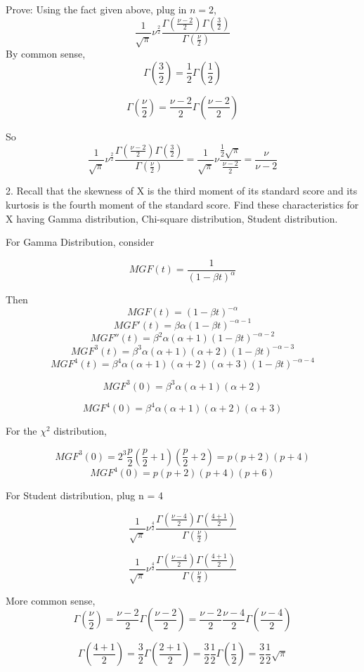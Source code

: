 \documentclass{article}
\begin{document}
Prove:
Using the fact given above, plug in $n = 2$, 
$$  \frac{1}{\sqrt{ \pi}} \nu^{\frac{2}{2}} \frac{\Gamma(\frac{\nu-2}{2})\Gamma(\frac{3}{2})}{\Gamma(\frac{\nu}{2})}$$
By common sense, 
$$\Gamma(\frac{3}{2}) = \frac{1}{2} \Gamma(\frac{1}{2})$$

$$\Gamma(\frac{\nu}{2}) = \frac{\nu-2}{2} \Gamma(\frac{\nu-2}{2})$$

So $$  \frac{1}{\sqrt{ \pi}} \nu^{\frac{2}{2}} \frac{\Gamma(\frac{\nu-2}{2})\Gamma(\frac{3}{2})}{\Gamma(\frac{\nu}{2})} = \frac{1}{\sqrt{ \pi}} \nu\frac{\frac{1}{2}\sqrt{\pi}}{\frac{\nu-2}{2}} =\frac\nu{\nu-2}  $$

2. Recall that the skewness of X is the third moment of its standard score and its kurtosis is the fourth moment of the standard score. Find these characteristics for X having Gamma distribution, Chi-square distribution, Student distribution.

For Gamma Distribution, consider 

$$MGF(t) = \frac{1}{(1-\beta t) ^ \alpha }$$

Then 
$$MGF(t) = {(1-\beta t) ^ {-\alpha} }$$
$$MGF'(t) = \beta \alpha {(1-\beta t) ^ {-\alpha-1} }$$
$$MGF''(t) = \beta^2 \alpha ({\alpha+1}){(1-\beta t) ^ {-\alpha-2} }$$
$$MGF^{3}(t) = \beta^3 \alpha ({\alpha+1})({\alpha+2}){(1-\beta t) ^ {-\alpha-3} }$$
$$MGF^{4}(t) = \beta^4 \alpha ({\alpha+1})({\alpha+2})({\alpha+3}){(1-\beta t) ^ {-\alpha-4} }$$

$$MGF^{3}(0) = \beta^3 \alpha ({\alpha+1})({\alpha+2}) $$

$$MGF^{4}(0) =  \beta^4 \alpha ({\alpha+1})({\alpha+2})({\alpha+3}) $$

For the $\chi^2$ distribution,

$$MGF^{3}(0) = 2^3 \frac{p}{2} ({\frac{p}{2}+1})({\frac{p}{2}+2}) = p(p+2)(p+4) $$
$$MGF^{4}(0) = p(p+2)(p+4)(p+6) $$

For Student distribution, plug n = 4

$$  \frac{1}{\sqrt{ \pi}} \nu^{\frac{4}{2}} \frac{\Gamma(\frac{\nu-4}{2})\Gamma(\frac{4+1}{2})}{\Gamma(\frac{\nu}{2})}$$

$$  \frac{1}{\sqrt{ \pi}} \nu^{\frac{4}{2}} \frac{\Gamma(\frac{\nu-4}{2})\Gamma(\frac{4+1}{2})}{\Gamma(\frac{\nu}{2})}$$

More common sense, 
$$\Gamma(\frac{\nu}{2}) = \frac{\nu-2}{2} \Gamma(\frac{\nu-2}{2}) =  \frac{\nu-2}{2} \frac{\nu-4}{2} \Gamma(\frac{\nu-4}{2}) $$

$$\Gamma(\frac{4+1}{2}) = \frac{3}{2}\Gamma(\frac{2+1}{2}) = \frac{3}{2} \frac{1}{2}\Gamma(\frac{1}{2}) = \frac{3}{2} \frac{1}{2} \sqrt{\pi}$$
\end{document}
